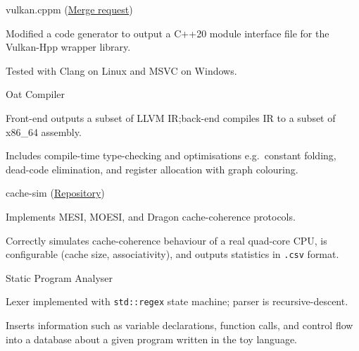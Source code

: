 \begin{cventries}
	{vulkan.cppm \footnotesize{(\href{https://github.com/KhronosGroup/Vulkan-Hpp/pull/1582}{Merge request})}} %
	{} %
	{} %
	{
		\begin{cvitems} %
			\item Modified a code generator to output a C++20 module interface file for the Vulkan-Hpp wrapper library.
			\item Tested with Clang on Linux and MSVC on Windows.
		\end{cvitems}
	}

	{Oat Compiler} %
	{} %
	{} %
	{
		\begin{cvitems} %
			\item Front-end outputs a subset of LLVM IR;\@ back-end compiles IR to a subset of x86\_64 assembly.
			\item Includes compile-time type-checking and optimisations e.g.\ constant folding, dead-code elimination, and register allocation with graph colouring.
		\end{cvitems}
	}


	{cache-sim \footnotesize(\href{https://github.com/sharadhr/cs4223-cache-sim}{Repository})} %
	{} %
	{} %
	{
		\begin{cvitems} %
			\item Implements MESI, MOESI, and Dragon cache-coherence protocols.
			\item Correctly simulates cache-coherence behaviour of a real quad-core CPU, is configurable (cache size, associativity), and outputs statistics in \texttt{.csv} format.
		\end{cvitems}
	}


	{Static Program Analyser} %
	{} %
	{} %
	{
		\begin{cvitems} %
			\item Lexer implemented with \texttt{std::regex} state machine; parser is recursive-descent.
			\item Inserts information such as variable declarations, function calls, and control flow into a database about a given program written in the toy language.
		\end{cvitems}
	}

\end{cventries}
